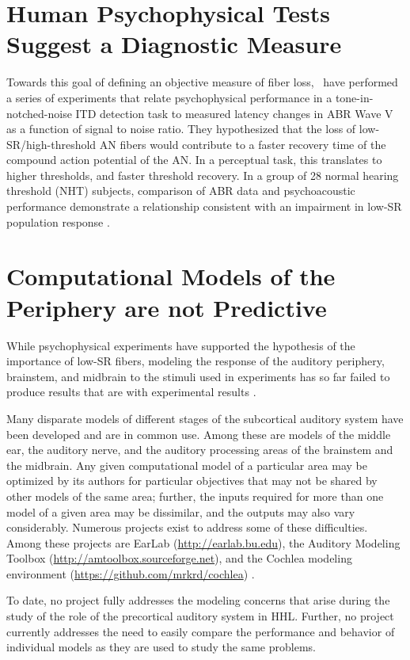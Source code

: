 \section{Human Psychophysical Tests Suggest a Diagnostic Measure}
Towards this goal of defining an objective measure of fiber loss,~\cite{Mehraei2015Individual,Mehraei2016Auditory} have performed a series of experiments that relate psychophysical performance in a tone-in-notched-noise ITD detection task to measured latency changes in ABR Wave V as a function of signal to noise ratio.  They hypothesized that the loss of low-SR/high-threshold AN fibers would contribute to a faster recovery time of the compound action potential of the AN. In a perceptual task, this translates to higher thresholds, and faster threshold recovery. In a group of 28 normal hearing threshold (NHT) subjects, comparison of ABR data and psychoacoustic performance demonstrate a relationship consistent with an impairment in low-SR population response \citep{Mehraei2016Auditory}.

\section{Computational Models of the Periphery are not Predictive}

While psychophysical experiments have supported the hypothesis of the importance of low-SR fibers, modeling the response of the auditory periphery, brainstem, and midbrain to the stimuli used in experiments has so far failed to produce results that are with experimental results \citep{Mehraei2016Auditory}.

Many disparate models of different stages of the subcortical auditory system have been developed and are in common use.  Among these are models of the middle ear, the auditory nerve, and the auditory processing areas of the brainstem and the midbrain.  Any given computational model of a particular area may be optimized by its authors for particular objectives that may not be shared by other models of the same area; further, the inputs required for more than one model of a given area may be dissimilar, and the outputs may also vary considerably.    Numerous projects exist to address some of these difficulties.  Among these projects are EarLab (\url{http://earlab.bu.edu}), the Auditory Modeling Toolbox (\url{http://amtoolbox.sourceforge.net}), and the Cochlea modeling environment (\url{https://github.com/mrkrd/cochlea}) \citep{Rudnicki2014Cochlea}.   

To date, no project fully addresses the modeling concerns that arise during the study of the role of the precortical auditory system in HHL. Further, no project currently addresses the need to easily compare the performance and behavior of individual models as they are used to study the same problems.

